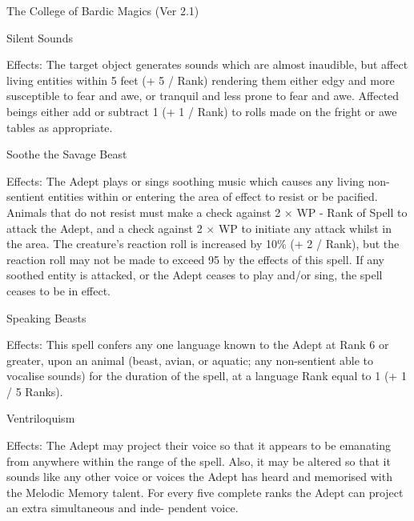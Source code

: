 \begin{Chapter}{The College of Bardic Magics (Ver 2.1)}
\begin{spell}[G-8]{Silent Sounds }

Effects:  The  target  object  generates  sounds  which 
are  almost  inaudible,  but  affect  living  entities 
within  5  feet  (+  5  /  Rank)  rendering  them  either 
edgy  and  more  susceptible  to  fear  and  awe,  or 
tranquil  and  less  prone  to  fear  and  awe.  Affected 
beings either add or subtract 1 (+ 1 / Rank) to rolls 
made on the fright or awe tables as appropriate. 
\end{spell}

\begin{spell}[G-9]{Soothe the Savage Beast }

Effects:  The  Adept  plays  or  sings  soothing  music 
which  causes  any  living  non-sentient  entities 
within or entering the area of  effect to resist or be 
pacified.  Animals  that  do  not  resist  must  make  a 
check against 2 × WP - Rank of Spell to attack the 
Adept, and a check against 2 × WP to initiate any 
attack  whilst  in  the  area.  The  creature’s  reaction 
roll is increased by 10\% (+ 2 / Rank), but the reaction  roll  may  not  be  made  to  exceed  95  by  the 
effects  of  this  spell.  If  any  soothed  entity  is  attacked, or the Adept ceases to play and/or sing, the 
spell ceases to be in effect. 
\end{spell}

\begin{spell}[G-10]{Speaking Beasts }

Effects: This spell confers any one language known 
to the Adept at Rank 6 or greater, upon an animal 
(beast,  avian,  or  aquatic;  any  non-sentient  able  to 
vocalise  sounds)  for  the  duration  of  the  spell,  at  a 
language Rank equal to 1 (+ 1 / 5 Ranks). 
\end{spell}

\begin{spell}[G-10]{Ventriloquism }

Effects:  The  Adept  may  project their  voice  so  that 
it  appears  to  be  emanating  from  anywhere  within 
the  range  of  the  spell.  Also,  it  may  be  altered  so 
that  it  sounds  like  any  other  voice  or  voices  the 
Adept  has  heard  and  memorised  with  the  Melodic 
Memory  talent.  For  every  five  complete  ranks  the 
Adept can project an extra simultaneous and inde-
pendent voice. 
\end{spell}



\end{Chapter}
